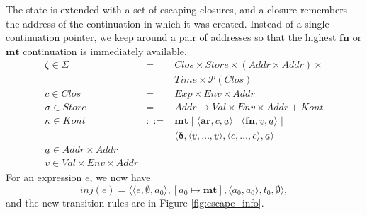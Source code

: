 \RequirePackage[hyphens]{url}\documentclass[12pt,oneside]{amsart}
\newcommand{\kw}[1]{\mathbf{#1}}
\begin{document}
The state is extended with a set of escaping closures, and a closure remembers the address of the continuation in which it was created.  Instead of a single continuation pointer, we keep around a pair of addresses so that the highest $\kw{fn}$ or $\kw{mt}$ continuation is immediately available.
\[\begin{array}{lll}
    \zeta \in \Sigma & = & Clos \times Store \times (Addr \times Addr) \times
        \\ & & Time \times \mathcal{P}(Clos) \\
    c \in Clos & = & Exp \times Env \times Addr \\
    \sigma \in Store & = & Addr \rightarrow Val \times Env \times Addr + Kont \\
    \kappa \in Kont & ::= & \kw{mt} \mid \langle\kw{ar}, c, \underline{a}\rangle \mid
        \langle\kw{fn}, \underline{v}, \underline{a}\rangle \mid \\ & & \langle\pmb{\delta}, \langle\underline{v}, \ldots, \underline{v}\rangle, \langle c, \ldots, c\rangle, \underline{a}\rangle \\
    \underline{a} \in Addr \times Addr \\
    \underline{v} \in Val \times Env \times Addr
\end{array}\]
For an expression $e$, we now have
\[inj(e) = \langle\langle e, \emptyset, a_0\rangle, [a_0\mapsto\kw{mt}], \langle a_0, a_0\rangle, t_0, \emptyset\rangle,\]
and the new transition rules are in Figure \ref{fig:escape_info}.
\end{document}
